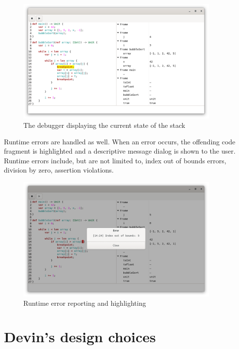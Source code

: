 \documentclass[UdineBachThesis,american,11pt]{PhdThesis}
\begin{document}
  \begin{figure}[h]
    \centering
    \includegraphics[width=0.9\textwidth]{5.png}
    \caption{The debugger displaying the current state of the stack}
    \label{figure:debugger}
  \end{figure}

  \pagebreak

  Runtime errors are handled as well. When an error occurs, the offending code
  fragment is highlighted and a descriptive message dialog is shown to the user.
  Runtime errors include, but are not limited to, index out of bounds errors,
  division by zero, assertion violations.

  \begin{figure}[h]
    \centering
    \includegraphics[width=0.9\textwidth]{6.png}
    \caption{Runtime error reporting and highlighting}
  \end{figure}

  \section{Devin's design choices}
\end{document}

